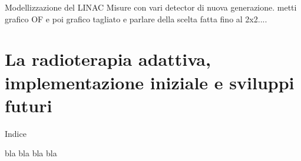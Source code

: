 \documentclass{beamer}
\begin{document}
\begin{frame}[t]{Modellizzazione del LINAC}
\footnotesize
{} Misure con vari detector di nuova generazione.
metti grafico OF e poi grafico tagliato e parlare della scelta fatta fino al 2x2....

\end{frame}








\section[La radioterapia adattiva]{La radioterapia adattiva, implementazione iniziale e sviluppi futuri}
\begin{frame}{Indice}
\tableofcontents[currentsection]
\end{frame}

\begin{frame}{bla bla}
bla bla
\end{frame}
\end{document}
